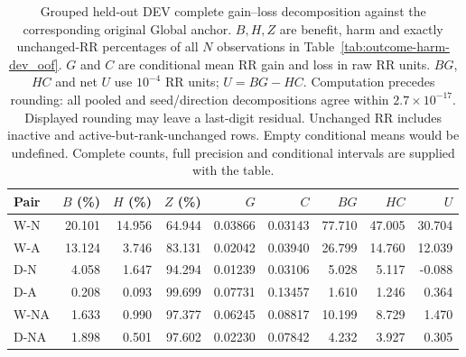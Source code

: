 \begin{table}[htbp]
\centering\footnotesize\setlength{\tabcolsep}{3pt}
\caption{Grouped held-out DEV complete gain--loss decomposition against the corresponding original Global anchor. $B,H,Z$ are benefit, harm and exactly unchanged-RR percentages of all $N$ observations in Table~\ref{tab:outcome-harm-dev_oof}. $G$ and $C$ are conditional mean RR gain and loss in raw RR units. $BG$, $HC$ and net $U$ use $10^{-4}$ RR units; $U=BG-HC$. Computation precedes rounding: all pooled and seed/direction decompositions agree within $2.7\times10^{-17}$. Displayed rounding may leave a last-digit residual. Unchanged RR includes inactive and active-but-rank-unchanged rows. Empty conditional means would be undefined. Complete counts, full precision and conditional intervals are supplied with the table.}
\label{tab:outcome-decomposition-dev_oof}
\begin{tabular}{lrrrrrrrr}
\toprule
Pair & $B$ (\%) & $H$ (\%) & $Z$ (\%) & $G$ & $C$ & $BG$ & $HC$ & $U$\\
\midrule
W-N & 20.101 & 14.956 & 64.944 & 0.03866 & 0.03143 & 77.710 & 47.005 & 30.704\\
W-A & 13.124 & 3.746 & 83.131 & 0.02042 & 0.03940 & 26.799 & 14.760 & 12.039\\
D-N & 4.058 & 1.647 & 94.294 & 0.01239 & 0.03106 & 5.028 & 5.117 & -0.088\\
D-A & 0.208 & 0.093 & 99.699 & 0.07731 & 0.13457 & 1.610 & 1.246 & 0.364\\
W-NA & 1.633 & 0.990 & 97.377 & 0.06245 & 0.08817 & 10.199 & 8.729 & 1.470\\
D-NA & 1.898 & 0.501 & 97.602 & 0.02230 & 0.07842 & 4.232 & 3.927 & 0.305\\
\bottomrule
\end{tabular}
\end{table}
